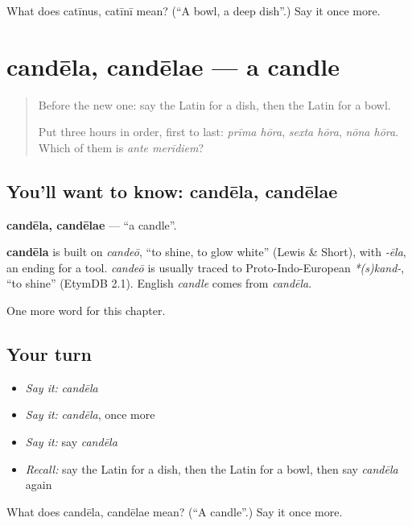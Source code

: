 \begin{tcolorbox}[breakable,colback=teal!4,colframe=teal!35!black,title={Before you move on}]
What does catīnus, catīnī mean? (\textquotedblleft{}A bowl, a deep dish\textquotedblright{}.) Say it once more.
\end{tcolorbox}
\section[candēla, candēlae]{candēla, candēlae — a candle}

\label{lesson:LA-C121-candela}



\begin{quote}
Before the new one: say the Latin for a dish, then the Latin for a bowl.

Put three hours in order, first to last: \emph{prīma hōra}, \emph{sexta hōra}, \emph{nōna hōra}. Which of them is \emph{ante merīdiem}?
\end{quote}

\subsection*{You'll want to know: candēla, candēlae}
\textbf{candēla, candēlae} — \textquotedblleft{}a candle\textquotedblright{}.

\begin{cousinweb}
\textbf{candēla} is built on \emph{candeō}, \textquotedblleft{}to shine, to glow white\textquotedblright{} (Lewis \& Short), with \emph{-ēla}, an ending for a tool. \emph{candeō} is usually traced to Proto-Indo-European \emph{*(s)kand-}, \textquotedblleft{}to shine\textquotedblright{} (EtymDB 2.1). English \emph{candle} comes from \emph{candēla}.
\end{cousinweb}

\begin{grammarlens}[title={What you've built}]
One more word for this chapter.
\end{grammarlens}

\subsection*{Your turn}
\begin{itemize}
\raggedright
  \item \emph{Say it:} \emph{candēla}
  \item \emph{Say it:} \emph{candēla}, once more
  \item \emph{Say it:} say \emph{candēla}
  \item \emph{Recall:} say the Latin for a dish, then the Latin for a bowl, then say \emph{candēla} again
\end{itemize}

\begin{tcolorbox}[breakable,colback=teal!4,colframe=teal!35!black,title={Before you move on}]
What does candēla, candēlae mean? (\textquotedblleft{}A candle\textquotedblright{}.) Say it once more.
\end{tcolorbox}
